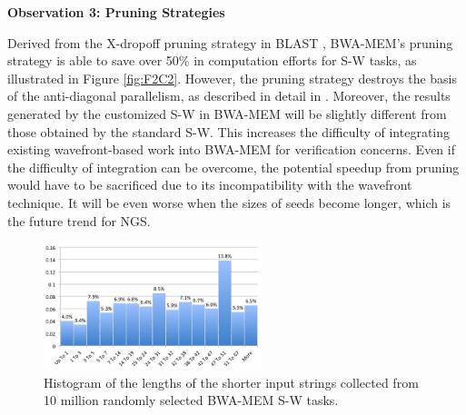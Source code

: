 \vspace{1pt}
\textbf{Observation 3: Pruning Strategies}
\vspace{1pt}

Derived from the X-dropoff pruning strategy in BLAST \cite{BLAST1990}, 
BWA-MEM's pruning strategy is able to save over 50\% in computation efforts for S-W tasks, as illustrated in Figure \ref{fig:F2C2}. 
However, the pruning strategy destroys the basis of the anti-diagonal parallelism, as described in detail in \cite{BWA-MEM}. 
Moreover, the results generated by the customized S-W in BWA-MEM will be slightly different from those obtained by the standard S-W. 
This increases the difficulty of integrating existing wavefront-based work into BWA-MEM for verification concerns. 
Even if the difficulty of integration can be overcome, 
the potential speedup from pruning would have to be sacrificed due to its incompatibility with the wavefront technique.
It will be even worse when the sizes of seeds become longer, which is the future trend for NGS.

\begin{figure}[!hbt]
	\begin{center}
		\includegraphics[width=2.5in]{Figures/Figure4C2.jpg}
		\caption {Histogram of the lengths of the shorter input strings collected from 10 million randomly selected BWA-MEM S-W tasks.}
		\label{fig:F4C2}
	\end{center}
\end{figure}
\vspace{-15pt}

